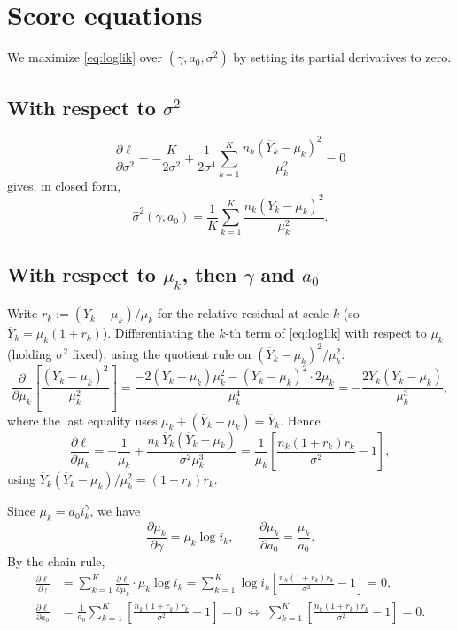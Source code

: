 \documentclass[11pt]{article}
\begin{document}
\section{Score equations}

We maximize \eqref{eq:loglik} over $(\gamma, a_0, \sigma^2)$ by setting its
partial derivatives to zero.

\subsection{With respect to $\sigma^2$}

\[
  \frac{\partial \ell}{\partial \sigma^2}
  = -\frac{K}{2\sigma^2} + \frac{1}{2\sigma^4}\sum_{k=1}^K \frac{n_k(\overline{Y}_k-\mu_k)^2}{\mu_k^2}
  = 0
\]
gives, in closed form,
\begin{equation}
\label{eq:sigmahat}
  \hat\sigma^2(\gamma, a_0) = \frac{1}{K}\sum_{k=1}^K \frac{n_k(\overline{Y}_k-\mu_k)^2}{\mu_k^2}.
\end{equation}

\subsection{With respect to $\mu_k$, then $\gamma$ and $a_0$}

Write $r_k := (\overline{Y}_k - \mu_k)/\mu_k$ for the relative residual at
scale $k$ (so $\overline{Y}_k = \mu_k(1+r_k)$). Differentiating the $k$-th
term of \eqref{eq:loglik} with respect to $\mu_k$ (holding $\sigma^2$ fixed),
using the quotient rule on $(\overline{Y}_k-\mu_k)^2/\mu_k^2$:
\[
  \frac{\partial}{\partial \mu_k}
  \left[\frac{(\overline{Y}_k-\mu_k)^2}{\mu_k^2}\right]
  = \frac{-2(\overline{Y}_k-\mu_k)\mu_k^2 - (\overline{Y}_k-\mu_k)^2 \cdot 2\mu_k}{\mu_k^4}
  = -\frac{2\overline{Y}_k(\overline{Y}_k-\mu_k)}{\mu_k^3},
\]
where the last equality uses $\mu_k + (\overline{Y}_k - \mu_k) = \overline{Y}_k$. Hence
\[
  \frac{\partial \ell}{\partial \mu_k}
  = -\frac{1}{\mu_k}
    + \frac{n_k\,\overline{Y}_k(\overline{Y}_k-\mu_k)}{\sigma^2 \mu_k^3}
  = \frac{1}{\mu_k}\left[\frac{n_k(1+r_k)r_k}{\sigma^2} - 1\right],
\]
using $\overline{Y}_k(\overline{Y}_k-\mu_k)/\mu_k^2 = (1+r_k)r_k$.

Since $\mu_k = a_0 i_k^\gamma$, we have
\[
  \frac{\partial \mu_k}{\partial \gamma} = \mu_k \log i_k,
  \qquad
  \frac{\partial \mu_k}{\partial a_0} = \frac{\mu_k}{a_0}.
\]
By the chain rule,
\begin{align}
  \frac{\partial \ell}{\partial \gamma}
  &= \sum_{k=1}^K \frac{\partial \ell}{\partial \mu_k}\cdot \mu_k \log i_k
   = \sum_{k=1}^K \log i_k
     \left[\frac{n_k(1+r_k)r_k}{\sigma^2} - 1\right] = 0,
   \label{eq:score-gamma}\\[4pt]
  \frac{\partial \ell}{\partial a_0}
  &= \frac{1}{a_0}\sum_{k=1}^K
     \left[\frac{n_k(1+r_k)r_k}{\sigma^2} - 1\right] = 0
   \ \Longleftrightarrow\
   \sum_{k=1}^K \left[\frac{n_k(1+r_k)r_k}{\sigma^2} - 1\right] = 0.
   \label{eq:score-a0}
\end{align}
\end{document}
